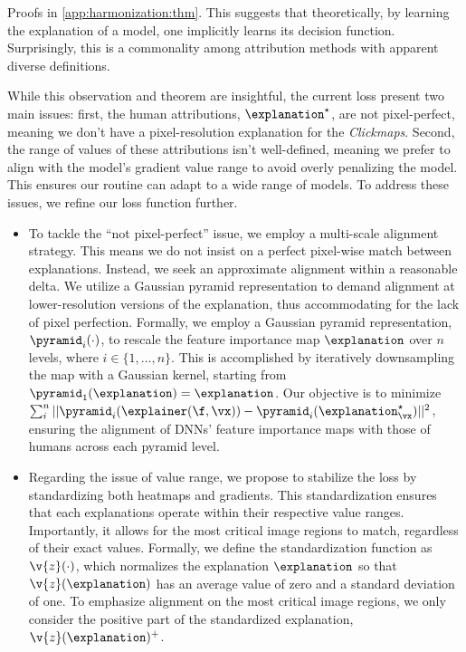 Proofs in \autoref{app:harmonization:thm}. This suggests that theoretically, by learning the explanation of a model, one implicitly learns its decision function. Surprisingly, this is a commonality among attribution methods with apparent diverse definitions.

While this observation and theorem are insightful, the current loss present two main issues: first, the human attributions, $\explanation^\star$, are not pixel-perfect, meaning we don't have a pixel-resolution explanation for the \textit{Clickmaps}. Second, the range of values of these attributions isn't well-defined, meaning we prefer to align with the model's gradient value range to avoid overly penalizing the model. This ensures our routine can adapt to a wide range of models. To address these issues, we refine our loss function further.

\begin{itemize}
    \item To tackle the ``not pixel-perfect'' issue, we employ a multi-scale alignment strategy. This means we do not insist on a perfect pixel-wise match between explanations. Instead, we seek an approximate alignment within a reasonable delta. We utilize a Gaussian pyramid representation to demand alignment at lower-resolution versions of the explanation, thus accommodating for the lack of pixel perfection. Formally, we employ a Gaussian pyramid representation, $\pyramid_i(\cdot)$, to rescale the feature importance map $\explanation$ over $n$ levels, where $i \in \{1, \ldots, n\}$. This is accomplished by iteratively downsampling the map with a Gaussian kernel, starting from $\pyramid_1(\explanation) = \explanation$. Our objective is to minimize $\sum_{i}^n || \pyramid_i(\explainer(\f, \vx)) - \pyramid_i(\explanation^\star_{\vx}) ||^2$, ensuring the alignment of DNNs' feature importance maps with those of humans across each pyramid level.

    \item Regarding the issue of value range, we propose to stabilize the loss by standardizing both heatmaps and gradients. This standardization ensures that each explanations operate within their respective value ranges. Importantly, it allows for the most critical image regions to match, regardless of their exact values. Formally, we define the standardization function as $\v{z}(\cdot)$, which normalizes the explanation $\explanation$ so that $\v{z}(\explanation)$ has an average value of zero and a standard deviation of one. To emphasize alignment on the most critical image regions, we only consider the positive part of the standardized explanation, $\v{z}(\explanation)^{+}$.
\end{itemize}

